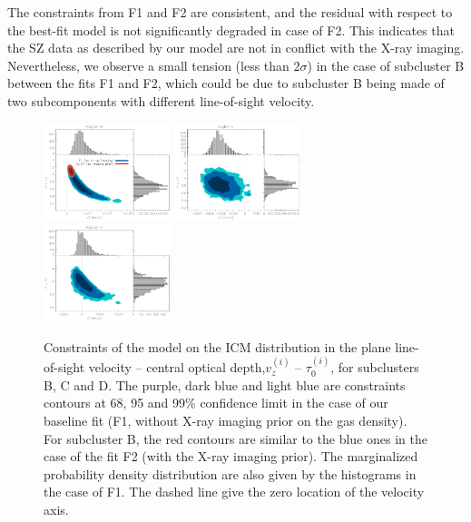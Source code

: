 \documentclass[twocolumn,traditabstract]{aa}
\begin{document}
The constraints from F1 and F2 are consistent, and the residual with respect to the best-fit model is not significantly degraded in case of F2. This indicates that the SZ data as described by our model are not in conflict with the X-ray imaging. Nevertheless, we observe a small tension (less than $2 \sigma$) in the case of subcluster B between the fits F1 and F2, which could be due to subcluster B being made of two subcomponents with different line-of-sight velocity.
\begin{figure}[h]
\centering
\includegraphics[width=0.33\textwidth]{Figure/Tau_vz_2dLikelihoods_B.pdf}
\includegraphics[width=0.33\textwidth]{Figure/Tau_vz_2dLikelihoods_C.pdf}
\includegraphics[width=0.33\textwidth]{Figure/Tau_vz_2dLikelihoods_D.pdf}
\caption{\footnotesize{Constraints of the model on the ICM distribution in the plane line-of-sight velocity -- central optical depth,$v_z^{(i)}$ -- $\tau_0^{(i)}$, for subclusters B, C and D. The purple, dark blue and light blue are constraints contours at 68, 95 and 99\% confidence limit in the case of our baseline fit (F1, without X-ray imaging prior on the gas density). For subcluster B, the red contours are similar to the blue ones in the case of the fit F2 (with the X-ray imaging prior). The marginalized probability density distribution are also given by the histograms in the case of F1. The dashed line give the zero location of the velocity axis.}}
\label{fig:velocity_constraint}
\end{figure}
\end{document}
